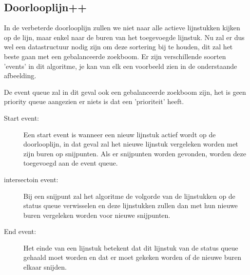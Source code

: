 \documentclass[12pt,a4paper]{article}
\begin{document}
	\subsection{Doorlooplijn++}
	In de verbeterde doorlooplijn zullen we niet naar alle actieve lijnstukken kijken op de lijn, maar enkel naar de buren van het toegevoegde lijnstuk. Nu zal er dus wel een datastructuur nodig zijn om deze sortering bij te houden, dit zal het beste gaan met een gebalanceerde zoekboom. Er zijn verschillende soorten 'events' in dit algoritme, je kan van elk een voorbeeld zien in de onderstaande afbeelding.  
	
	\begin{figure}[h]
		\centering
		\label{fig:sweepline-example}
	\end{figure}

	De event queue zal in dit geval ook een gebalanceerde zoekboom zijn, het is geen priority queue aangezien er niets is dat een 'prioriteit' heeft.
	\begin{description}
		\item[Start event:] Een start event is wanneer een nieuw lijnstuk actief wordt op de doorlooplijn, in dat geval zal het nieuwe lijnstuk vergeleken worden met zijn buren op snijpunten. Als er snijpunten worden gevonden, worden deze toegevoegd aan de event queue. 
		\item[intersectoin event:] Bij een snijpunt zal het algoritme de volgorde van de lijnstukken op de status queue verwisselen en deze lijnstukken zullen dan met hun nieuwe buren vergeleken worden voor nieuwe snijpunten. 
		\item[End event:] Het einde van een lijnstuk betekent dat dit lijnstuk van de status queue gehaald moet worden en dat er moet gekeken worden of de nieuwe buren elkaar snijden. 
	\end{description}
\end{document}
